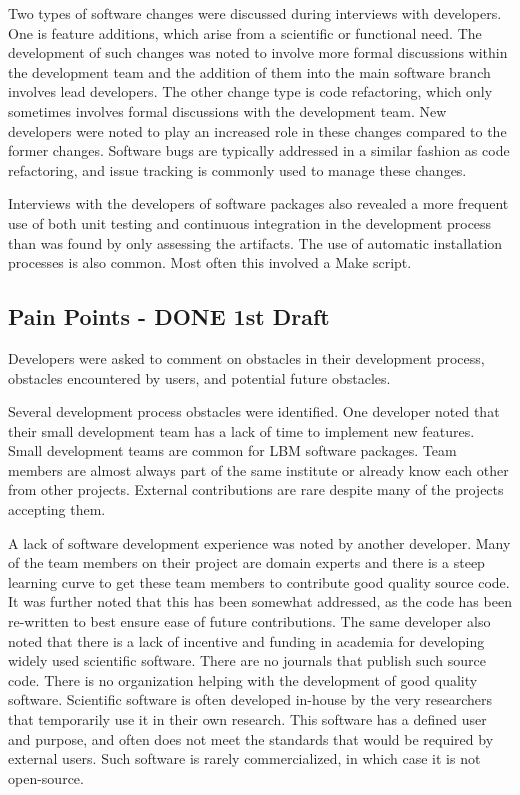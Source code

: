 \documentclass[12pt, notitlepage]{article}
\begin{document}
Two types of software changes were discussed during interviews with developers. One is feature additions, which arise from a scientific or functional need. The development of such changes was noted to involve more formal discussions within the development team and the addition of them into the main software branch involves lead developers. The other change type is code refactoring, which only sometimes involves formal discussions with the development team. New developers were noted to play an increased role in these changes compared to the former changes. Software bugs are typically addressed in a similar fashion as code refactoring, and issue tracking is commonly used to manage these changes. 

Interviews with the developers of software packages also revealed a more frequent use of both unit testing and continuous integration in the development process than was found by only assessing the artifacts. The use of automatic installation processes is also common. Most often this involved a Make script.


\subsection{Pain Points - DONE 1st Draft}

Developers were asked to comment on obstacles in their development process, obstacles encountered by users, and potential future obstacles. 

Several development process obstacles were identified. One developer noted that their small development team has a lack of time to implement new features. Small development teams are common for LBM software packages. Team members are almost always part of the same institute or already know each other from other projects. External contributions are rare despite many of the projects accepting them.

A lack of software development experience was noted by another developer. Many of the team members on their project are domain experts and there is a steep learning curve to get these team members to contribute good quality source code. It was further noted that this has been somewhat addressed, as the code has been re-written to best ensure ease of future contributions. The same developer also noted that there is a lack of incentive and funding in academia for developing widely used scientific software. There are no journals that publish such source code. There is no organization helping with the development of good quality software. Scientific software is often developed in-house by the very researchers that temporarily use it in their own research. This software has a defined user and purpose, and often does not meet the standards that would be required by external users. Such software is rarely commercialized, in which case it is not open-source. 
\end{document}
